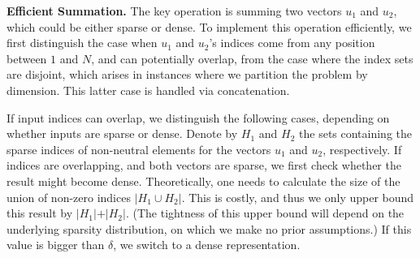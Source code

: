 \documentclass[11pt]{article}
\renewcommand{\paragraph}[1]{\vspace{0.1em} \noindent \textbf{#1}}
\begin{document}
\paragraph{Efficient Summation.}
The key operation is summing two vectors $u_1$ and $u_2$, which could be
either sparse or dense. To implement this operation efficiently, 
we first distinguish the case when $u_1$ and
$u_2$'s indices come from any position between $1$ and $N$, and can
potentially overlap, from the case where the index sets are disjoint, which arises in instances where we partition the problem by dimension. 
This latter case is handled via concatenation.

If input indices can overlap, we distinguish the following cases, depending on whether inputs are sparse or dense. 
Denote by $H_1$ and $H_2$ the sets containing the sparse indices of
non-neutral elements for the vectors $u_1$ and $u_2$, respectively. 
%
% 
%
%
%
%
%
%
If indices are overlapping, and both vectors
are sparse, we first check whether the result might become
dense.  Theoretically, one needs to calculate the size of the union of
non-zero indices $\vert H_1 \cup H_2 \vert$. 
This is costly, and thus we only upper bound this result by $\vert H_1 \vert + \vert H_2 \vert$. 
(The tightness of this upper bound will depend on the underlying sparsity distribution, on which we make no prior assumptions.)
If this value is bigger than
$\delta$, we switch to a dense representation. 
\end{document}
